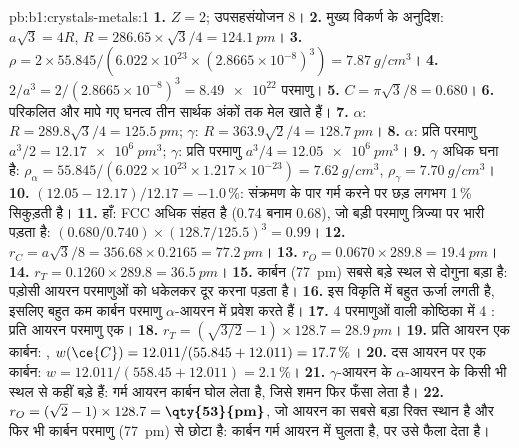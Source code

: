 \begin{solution}{pb:b1:crystals-metals:1}
\textbf{1.} $Z = 2$; उपसहसंयोजन 8।
\textbf{2.} मुख्य विकर्ण के अनुदिश: $a\sqrt3 = 4R$, $R = 286.65 \times
\sqrt3/4 = \qty{124.1}{pm}$।
\textbf{3.} $\rho = 2 \times 55.845/(6.022 \times 10^{23} \times (2.8665
\times 10^{-8})^3) = \qty{7.87}{g/cm^3}$।
\textbf{4.} $2/a^3 = 2/(2.8665 \times 10^{-8})^3 = \num{8.49e22}$ परमाणु।
\textbf{5.} $C = \pi\sqrt3/8 = 0.680$।
\textbf{6.} परिकलित और मापे गए घनत्व तीन सार्थक अंकों तक मेल खाते हैं।
\textbf{7.} $\alpha$: $R = 289.8\sqrt3/4 = \qty{125.5}{pm}$; $\gamma$:
$R = 363.9\sqrt2/4 = \qty{128.7}{pm}$।
\textbf{8.} $\alpha$: प्रति परमाणु $a^3/2 = \qty{12.17e6}{pm^3}$; $\gamma$:
प्रति परमाणु $a^3/4 = \qty{12.05e6}{pm^3}$।
\textbf{9.} $\gamma$ अधिक घना है: $\rho_\alpha = 55.845/(6.022 \times 10^{23}
\times 1.217 \times 10^{-23}) = \qty{7.62}{g/cm^3}$, $\rho_\gamma =
\qty{7.70}{g/cm^3}$।
\textbf{10.} $(12.05 - 12.17)/12.17 = -1.0\,\%$: संक्रमण के पार गर्म करने पर
छड़ लगभग 1\,\% सिकुड़ती है।
\textbf{11.} हाँ: FCC अधिक संहत है (0.74 बनाम 0.68), जो बड़ी
परमाणु त्रिज्या पर भारी पड़ता है: $(0.680/0.740) \times (128.7/125.5)^3 = 0.99$।
\textbf{12.} $r_C = a\sqrt3/8 = 356.68 \times 0.2165 = \qty{77.2}{pm}$।
\textbf{13.} $r_O = 0.0670 \times 289.8 = \qty{19.4}{pm}$।
\textbf{14.} $r_T = 0.1260 \times 289.8 = \qty{36.5}{pm}$।
\textbf{15.} कार्बन (\qty{77}{pm}) सबसे बड़े स्थल से दोगुना बड़ा है:
पड़ोसी आयरन परमाणुओं को धकेलकर दूर करना पड़ता है।
\textbf{16.} इस विकृति में बहुत ऊर्जा लगती है, इसलिए बहुत कम कार्बन परमाणु
$\alpha$-आयरन में प्रवेश करते हैं।
\textbf{17.} 4 परमाणुओं वाली कोष्ठिका में 4 : प्रति आयरन परमाणु एक।
\textbf{18.} $r_T = (\sqrt{3/2} - 1) \times 128.7 = \qty{28.9}{pm}$।
\textbf{19.} प्रति आयरन एक कार्बन: , $w(\ce{C}) = 12.011/(55.845 +
12.011) = 17.7\,\%$।
\textbf{20.} दस आयरन पर एक कार्बन: $w = 12.011/(558.45 + 12.011) =
2.1\,\%$।
\textbf{21.} $\gamma$-आयरन के  $\alpha$-आयरन के किसी भी स्थल से
कहीं बड़े हैं: गर्म आयरन कार्बन घोल लेता है, जिसे शमन फिर
फँसा लेता है।
\textbf{22.} $r_O = (\sqrt2 - 1) \times 128.7 = \textbf{\qty{53}{pm}}$, जो
आयरन का सबसे बड़ा रिक्त स्थान है और फिर भी कार्बन परमाणु (\qty{77}{pm}) से छोटा है:
कार्बन गर्म आयरन में घुलता है, पर उसे फैला देता है।
\end{solution}
